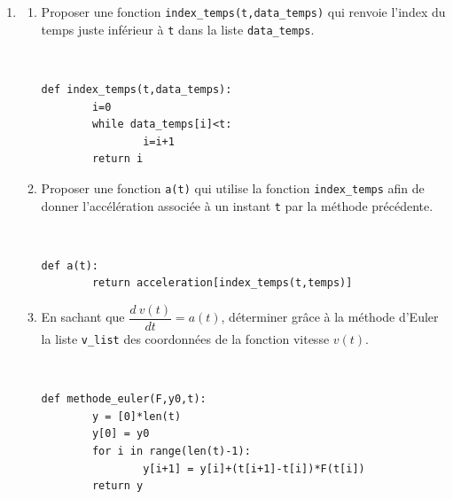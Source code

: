 \documentclass[a4paper,12pt]{article}
\begin{document}
\begin{enumerate}
\item \begin{enumerate}
\item Proposer une fonction \verb?index_temps(t,data_temps)? qui renvoie l'index du temps juste inférieur à \verb?t? dans la liste \verb?data_temps?.
\begin{solution}~\ \\
\begin{verbatim}
def index_temps(t,data_temps):
        i=0
        while data_temps[i]<t:
                i=i+1
        return i
\end{verbatim}
\end{solution}
\item Proposer une fonction \verb?a(t)? qui utilise la fonction \verb?index_temps? afin de donner l'accélération associée à un instant \verb?t? par la méthode précédente.
\begin{solution}~\ \\
\begin{verbatim}
def a(t):
        return acceleration[index_temps(t,temps)]
\end{verbatim}
\end{solution}
\item En sachant que $\dfrac{d\ v(t)}{dt}=a(t)$, déterminer grâce à la méthode d'Euler la liste \verb?v_list? des coordonnées de la fonction vitesse $v(t)$.
\begin{solution}~\ \\
\begin{verbatim}
def methode_euler(F,y0,t):
        y = [0]*len(t)
        y[0] = y0
        for i in range(len(t)-1):
                y[i+1] = y[i]+(t[i+1]-t[i])*F(t[i])
        return y


\end{verbatim}
\end{solution}
\end{enumerate}
\end{enumerate}
\end{document}

